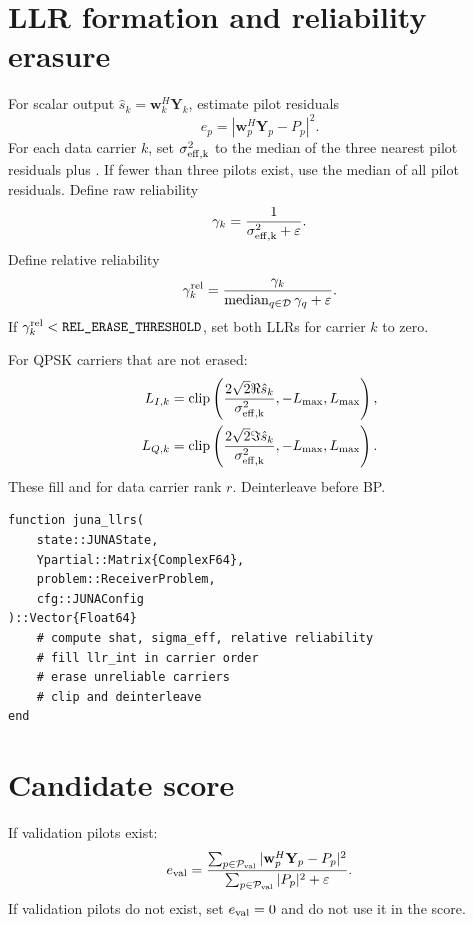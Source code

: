 \documentclass[11pt]{article}
\newcommand{\eps}{\varepsilon}
\newcommand{\code}[1]{\texttt{\detokenize{#1}}}
\begin{document}
\clearpage
\section{LLR formation and reliability erasure}

For scalar output $\hat s_k=\mathbf w_k^H\mathbf Y_k$, estimate pilot residuals
\begin{equation}
e_p=|\mathbf w_p^H\mathbf Y_p-P_p|^2.
\end{equation}
For each data carrier $k$, set $\sigma_{\rm eff,k}^2$ to the median of the three nearest pilot residuals plus \code{EPS}. If fewer than three pilots exist, use the median of all pilot residuals. Define raw reliability
\begin{equation}
\gamma_k=\frac{1}{\sigma_{\rm eff,k}^2+\eps}.
\end{equation}
Define relative reliability
\begin{equation}
\gamma_k^{\rm rel}=\frac{\gamma_k}{\operatorname{median}_{q\in\mathcal D}\gamma_q+\eps}.
\end{equation}
If $\gamma_k^{\rm rel}<\code{REL_ERASE_THRESHOLD}$, set both LLRs for carrier $k$ to zero.

For QPSK carriers that are not erased:
\begin{align}
L_{I,k}&=\operatorname{clip}\left(\frac{2\sqrt2\Re\hat s_k}{\sigma_{\rm eff,k}^2},-L_{\max},L_{\max}\right),\\
L_{Q,k}&=\operatorname{clip}\left(\frac{2\sqrt2\Im\hat s_k}{\sigma_{\rm eff,k}^2},-L_{\max},L_{\max}\right).
\end{align}
These fill \code{llr_int[2r-1]} and \code{llr_int[2r]} for data carrier rank $r$. Deinterleave before BP.

\begin{lstlisting}
function juna_llrs(
    state::JUNAState,
    Ypartial::Matrix{ComplexF64},
    problem::ReceiverProblem,
    cfg::JUNAConfig
)::Vector{Float64}
    # compute shat, sigma_eff, relative reliability
    # fill llr_int in carrier order
    # erase unreliable carriers
    # clip and deinterleave
end
\end{lstlisting}

\section{Candidate score}

If validation pilots exist:
\begin{equation}
e_{\rm val}=\frac{\sum_{p\in\mathcal P_{\rm val}}|\mathbf w_p^H\mathbf Y_p-P_p|^2}{\sum_{p\in\mathcal P_{\rm val}}|P_p|^2+\eps}.
\end{equation}
If validation pilots do not exist, set $e_{\rm val}=0$ and do not use it in the score.
\end{document}
